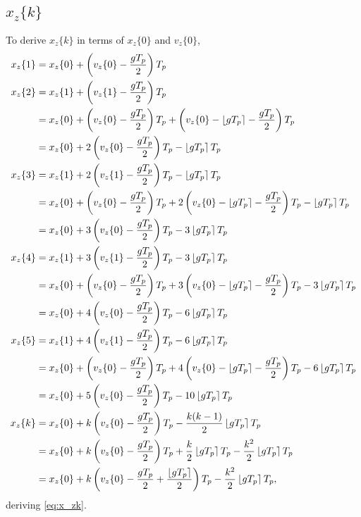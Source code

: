 \subsection{\texorpdfstring{$x_z\{k\}$}{x\_z k}}
\label{app:derive_x_zk}
To derive $x_z\{k\}$ in terms of $x_z\{0\}$ and $v_z\{0\}$,
\begin{align*}
x_z\{1\} &= x_z\{0\} + \left(v_z\{0\} - \frac{gT_p}{2} \right) T_p\\
x_z\{2\} &= x_z\{1\} + \left(v_z\{1\} - \frac{gT_p}{2} \right) T_p\\
&= x_z\{0\} + \left(v_z\{0\} - \frac{gT_p}{2} \right) T_p + \left(v_z\{0\} - \left\lfloor gT_p\right\rceil - \frac{gT_p}{2} \right) T_p\\
&= x_z\{0\} + 2\left(v_z\{0\} - \frac{gT_p}{2} \right) T_p - \left\lfloor gT_p\right\rceil T_p\\
x_z\{3\} &= x_z\{1\} + 2\left(v_z\{1\} - \frac{gT_p}{2} \right) T_p - \left\lfloor gT_p\right\rceil T_p\\
&= x_z\{0\} + \left(v_z\{0\} - \frac{gT_p}{2} \right) T_p + 2\left(v_z\{0\} - \left\lfloor gT_p\right\rceil - \frac{gT_p}{2} \right) T_p - \left\lfloor gT_p\right\rceil T_p\\
&= x_z\{0\} + 3\left(v_z\{0\} - \frac{gT_p}{2} \right) T_p - 3\left\lfloor gT_p\right\rceil T_p\\
x_z\{4\} &= x_z\{1\} + 3\left(v_z\{1\} - \frac{gT_p}{2} \right) T_p - 3\left\lfloor gT_p\right\rceil T_p\\
&= x_z\{0\} + \left(v_z\{0\} - \frac{gT_p}{2} \right) T_p + 3\left(v_z\{0\} - \left\lfloor gT_p\right\rceil - \frac{gT_p}{2} \right) T_p - 3\left\lfloor gT_p\right\rceil T_p\\
&= x_z\{0\} + 4\left(v_z\{0\} - \frac{gT_p}{2} \right) T_p - 6\left\lfloor gT_p\right\rceil T_p\\
x_z\{5\} &= x_z\{1\} + 4\left(v_z\{1\} - \frac{gT_p}{2} \right) T_p - 6\left\lfloor gT_p\right\rceil T_p\\
&= x_z\{0\} + \left(v_z\{0\} - \frac{gT_p}{2} \right) T_p + 4\left(v_z\{0\} - \left\lfloor gT_p\right\rceil - \frac{gT_p}{2} \right) T_p - 6\left\lfloor gT_p\right\rceil T_p\\
&= x_z\{0\} + 5\left(v_z\{0\} - \frac{gT_p}{2} \right) T_p - 10\left\lfloor gT_p\right\rceil T_p\\
x_z\{k\} &= x_z\{0\} + k\left(v_z\{0\} - \frac{gT_p}{2} \right) T_p - \frac{k(k - 1)}{2} \left\lfloor gT_p\right\rceil T_p\\
&= x_z\{0\} + k\left(v_z\{0\} - \frac{gT_p}{2} \right) T_p + \frac{k}{2} \left\lfloor gT_p\right\rceil T_p - \frac{k^2}{2} \left\lfloor gT_p\right\rceil T_p\\
&= x_z\{0\} + k\left(v_z\{0\} - \frac{gT_p}{2} + \frac{\left\lfloor gT_p\right\rceil}{2} \right) T_p - \frac{k^2}{2} \left\lfloor gT_p\right\rceil T_p,
\end{align*}
deriving \eqref{eq:x_zk}.
